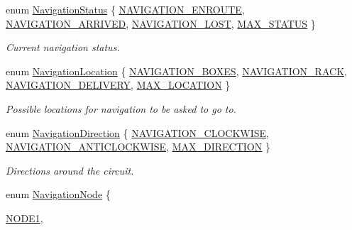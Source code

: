 \begin{DoxyCompactItemize}
enum \hyperlink{namespaceIDP_a1a96e566e4d675fdf20780cc96d92283}{NavigationStatus} \{ \hyperlink{namespaceIDP_a1a96e566e4d675fdf20780cc96d92283a9f52fe7970aefcb1b74e9aea3798f39d}{NAVIGATION\_\-ENROUTE}, 
\hyperlink{namespaceIDP_a1a96e566e4d675fdf20780cc96d92283ab9e83c995cb23a5782b23b198dcbabcb}{NAVIGATION\_\-ARRIVED}, 
\hyperlink{namespaceIDP_a1a96e566e4d675fdf20780cc96d92283ad75d1c5522e0a38dbe62266912d411ba}{NAVIGATION\_\-LOST}, 
\hyperlink{namespaceIDP_a1a96e566e4d675fdf20780cc96d92283a6911d3c0411bacf5135884884fb86093}{MAX\_\-STATUS}
 \}
\begin{DoxyCompactList}\small\item\em Current navigation status. \item\end{DoxyCompactList}\item 
enum \hyperlink{namespaceIDP_ab9c412f0fd539b5d70385066c30465a0}{NavigationLocation} \{ \hyperlink{namespaceIDP_ab9c412f0fd539b5d70385066c30465a0a0cfb642ce5e4133706998843eb3c8da1}{NAVIGATION\_\-BOXES}, 
\hyperlink{namespaceIDP_ab9c412f0fd539b5d70385066c30465a0af1bde0912725a75705d0fb74637f20c1}{NAVIGATION\_\-RACK}, 
\hyperlink{namespaceIDP_ab9c412f0fd539b5d70385066c30465a0a10e09a3f2969d951f0dc233cb76eb4bf}{NAVIGATION\_\-DELIVERY}, 
\hyperlink{namespaceIDP_ab9c412f0fd539b5d70385066c30465a0a4db81c4e7223eb8250c3575d1962241d}{MAX\_\-LOCATION}
 \}
\begin{DoxyCompactList}\small\item\em Possible locations for navigation to be asked to go to. \item\end{DoxyCompactList}\item 
enum \hyperlink{namespaceIDP_a899dbbc9d55dd4919ded1859281f503d}{NavigationDirection} \{ \hyperlink{namespaceIDP_a899dbbc9d55dd4919ded1859281f503daf54b8983cf0d707430d34ada92ded9f6}{NAVIGATION\_\-CLOCKWISE}, 
\hyperlink{namespaceIDP_a899dbbc9d55dd4919ded1859281f503da63c9c55ca2ca92e66c0959dc14c19d4e}{NAVIGATION\_\-ANTICLOCKWISE}, 
\hyperlink{namespaceIDP_a899dbbc9d55dd4919ded1859281f503da71609a18cba61e0b52f3f5de70e307d8}{MAX\_\-DIRECTION}
 \}
\begin{DoxyCompactList}\small\item\em Directions around the circuit. \item\end{DoxyCompactList}\item 
enum \hyperlink{namespaceIDP_a286f26dda01010063dff761803b4cd16}{NavigationNode} \{ \par
\hyperlink{namespaceIDP_a286f26dda01010063dff761803b4cd16a01e42e06cc228327ff3d4288b7c416a7}{NODE1}, 

\end{DoxyCompactItemize}
